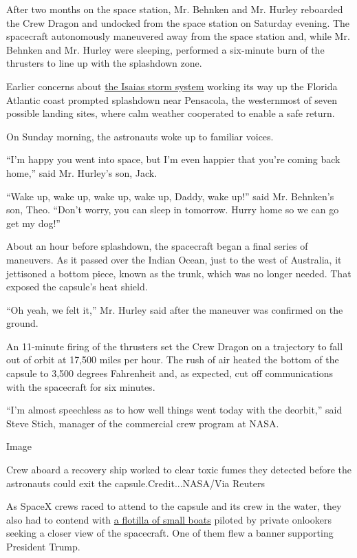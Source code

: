 After two months on the space station, Mr. Behnken and Mr. Hurley
reboarded the Crew Dragon and undocked from the space station on
Saturday evening. The spacecraft autonomously maneuvered away from the
space station and, while Mr. Behnken and Mr. Hurley were sleeping,
performed a six-minute burn of the thrusters to line up with the
splashdown zone.

Earlier concerns about
\href{https://www.nytimes3xbfgragh.onion/2020/08/02/us/Hurricane-Isaias-track.html}{the
Isaias storm system} working its way up the Florida Atlantic coast
prompted splashdown near Pensacola, the westernmost of seven possible
landing sites, where calm weather cooperated to enable a safe return.

On Sunday morning, the astronauts woke up to familiar voices.

``I'm happy you went into space, but I'm even happier that you're coming
back home,'' said Mr. Hurley's son, Jack.

``Wake up, wake up, wake up, wake up, Daddy, wake up!'' said Mr.
Behnken's son, Theo. ``Don't worry, you can sleep in tomorrow. Hurry
home so we can go get my dog!''

About an hour before splashdown, the spacecraft began a final series of
maneuvers. As it passed over the Indian Ocean, just to the west of
Australia, it jettisoned a bottom piece, known as the trunk, which was
no longer needed. That exposed the capsule's heat shield.

``Oh yeah, we felt it,'' Mr. Hurley said after the maneuver was
confirmed on the ground.

An 11-minute firing of the thrusters set the Crew Dragon on a trajectory
to fall out of orbit at 17,500 miles per hour. The rush of air heated
the bottom of the capsule to 3,500 degrees Fahrenheit and, as expected,
cut off communications with the spacecraft for six minutes.

``I'm almost speechless as to how well things went today with the
deorbit,'' said Steve Stich, manager of the commercial crew program at
NASA.

Image

Crew aboard a recovery ship worked to clear toxic fumes they detected
before the astronauts could exit the capsule.Credit...NASA/Via Reuters

As SpaceX crews raced to attend to the capsule and its crew in the
water, they also had to contend with
\href{https://www.nytimes3xbfgragh.onion/2020/08/02/us/flag-boat-SpaceX.html}{a
flotilla of small boats} piloted by private onlookers seeking a closer
view of the spacecraft. One of them flew a banner supporting President
Trump.

